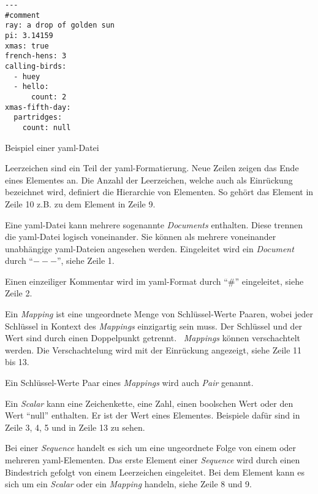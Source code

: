 \begin{listing}[htp]
      \begin{verbatim}
---
#comment
ray: a drop of golden sun
pi: 3.14159
xmas: true
french-hens: 3
calling-birds:
  - huey
  - hello:
      count: 2
xmas-fifth-day:
  partridges:
    count: null
      \end{verbatim}
      \caption{Beispiel einer \acs{yaml}-Datei}
      \label{lst:yaml-example}
\end{listing}

\begin{description}
      \setlength\itemsep{-0.5cm}
      \item[Einrückung und Leerzeichen]
            Leerzeichen sind ein Teil der \acs{yaml}-Formatierung. Neue Zeilen zeigen das Ende eines Elementes an.
            Die Anzahl der Leerzeichen, welche auch als Einrückung bezeichnet wird, definiert die Hierarchie von Elementen.
            So gehört das Element in Zeile 10 z.B. zu dem Element in Zeile 9.
      \item[Document]
            Eine \ac{yaml}-Datei kann mehrere sogenannte \textit{Documents} enthalten. Diese trennen die \ac{yaml}-Datei logisch voneinander.
            Sie können als mehrere voneinander unabhängige \ac{yaml}-Dateien angesehen werden.
            Eingeleitet wird ein \textit{Document}
            durch ``$---$'', siehe Zeile 1.
      \item[Kommentare]
            Einen einzeiliger Kommentar wird im \ac{yaml}-Format durch ``$\#$'' eingeleitet, siehe Zeile 2.
      \item[Mapping]
            Ein \textit{Mapping} ist eine ungeordnete Menge von Schlüssel-Werte Paaren, wobei jeder Schlüssel
            in Kontext des \textit{Mappings} einzigartig sein muss.
            Der Schlüssel und der Wert sind durch einen Doppelpunkt getrennt.
            \ \textit{Mappings} können verschachtelt werden.
            Die Verschachtelung wird mit der Einrückung angezeigt, siehe Zeile 11 bis 13.
      \item[Pair]
            Ein Schlüssel-Werte Paar eines \textit{Mappings} wird auch \textit{Pair} genannt.
      \item[Scalar]
            Ein \textit{Scalar} kann eine Zeichenkette, eine Zahl, einen boolschen Wert oder den Wert ``null'' enthalten.
            Er ist der Wert eines Elementes.
            Beispiele dafür sind in Zeile 3, 4, 5 und in Zeile 13 zu sehen.
      \item[Sequence]
            Bei einer \textit{Sequence} handelt es sich um eine ungeordnete Folge von einem oder mehreren \ac{yaml}-Elementen.
            Das erste Element einer \textit{Sequence} wird durch einen Bindestrich gefolgt von einem Leerzeichen eingeleitet.
            Bei dem Element kann es sich um ein \textit{Scalar} oder ein \textit{Mapping} handeln, siehe Zeile 8 und 9.

\end{description}


